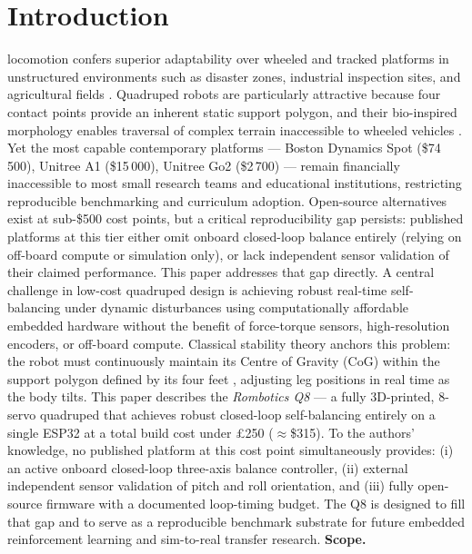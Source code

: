 \documentclass[journal]{IEEEtran}
\begin{document}
\section{Introduction}
\label{sec:intro}
 locomotion confers superior adaptability
over wheeled and tracked platforms in unstructured environments
such as disaster zones, industrial inspection sites, and
agricultural fields \cite{biswal2021development,pratt2000legged}.
Quadruped robots are particularly attractive because four contact
points provide an inherent static support polygon, and their
bio-inspired morphology enables traversal of complex terrain
inaccessible to wheeled vehicles \cite{bledt2018cheetah,hutter2016anymal}.
Yet the most capable contemporary platforms ---
Boston Dynamics Spot (\$74\,500), Unitree A1 (\$15\,000),
Unitree Go2 (\$2\,700) \cite{unitree2023go2} ---
remain financially inaccessible to most small research teams
and educational institutions, restricting reproducible
benchmarking and curriculum adoption.
Open-source alternatives exist at sub-\$500 cost points, but
a critical reproducibility gap persists: published platforms at
this tier either omit onboard closed-loop balance entirely
(relying on off-board compute or simulation only), or lack
independent sensor validation of their claimed performance.
This paper addresses that gap directly.
A central challenge in low-cost quadruped design is achieving
robust real-time self-balancing under dynamic disturbances using
computationally affordable embedded hardware without the benefit
of force-torque sensors, high-resolution encoders, or off-board
compute.
Classical stability theory anchors this problem: the robot must
continuously maintain its Centre of Gravity (CoG) within the
support polygon defined by its four feet
\cite{vukobratovic2004zmp,jia2018stability}, adjusting leg
positions in real time as the body tilts.
This paper describes the \textit{Rombotics Q8} --- a fully
3D-printed, 8-servo quadruped that achieves robust closed-loop
self-balancing entirely on a single ESP32 at a total build cost
under \pounds250 ($\approx$\$315).
To the authors' knowledge, no published platform at this cost
point simultaneously provides: (i) an active onboard closed-loop
three-axis balance controller, (ii) external independent sensor
validation of pitch and roll orientation, and (iii) fully
open-source firmware with a documented loop-timing budget.
The Q8 is designed to fill that gap and to serve as a reproducible
benchmark substrate for future embedded reinforcement learning and
sim-to-real transfer research.
\noindent\textbf{Scope.}
\end{document}
